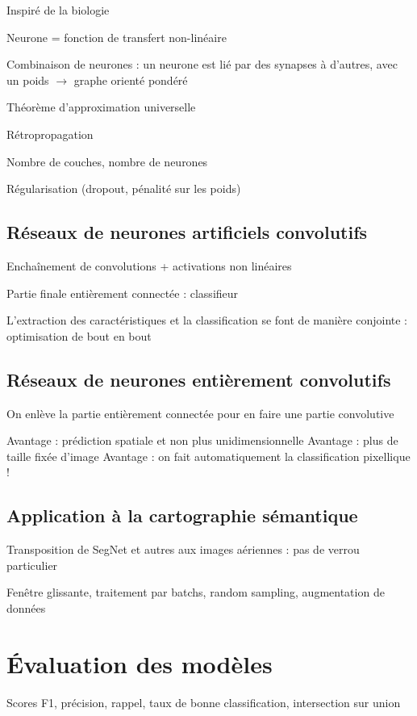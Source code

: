 Inspiré de la biologie

Neurone = fonction de transfert non-linéaire

Combinaison de neurones : un neurone est lié par des synapses à d'autres, avec un poids
$\rightarrow$ graphe orienté pondéré

Théorème d'approximation universelle

Rétropropagation

Nombre de couches, nombre de neurones

Régularisation (dropout, pénalité sur les poids)

\subsection{Réseaux de neurones artificiels convolutifs}

Enchaînement de convolutions + activations non linéaires

Partie finale entièrement connectée : classifieur

L'extraction des caractéristiques et la classification se font de manière conjointe : optimisation de bout en bout

\subsection{Réseaux de neurones entièrement convolutifs}

On enlève la partie entièrement connectée pour en faire une partie convolutive

Avantage : prédiction spatiale et non plus unidimensionnelle
Avantage : plus de taille fixée d'image
Avantage : on fait automatiquement la classification pixellique !

\subsection{Application à la cartographie sémantique}

Transposition de SegNet et autres aux images aériennes : pas de verrou particulier

Fenêtre glissante, traitement par batchs, random sampling, augmentation de données

\section{Évaluation des modèles}

Scores F1, précision, rappel, taux de bonne classification, intersection sur union

